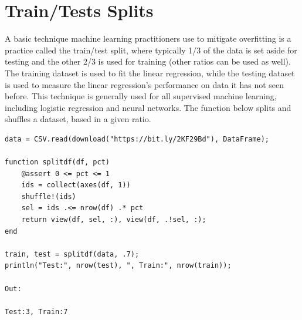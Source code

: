 \documentclass[a4paper, 11pt]{article}
\begin{document}
\section{Train/Tests Splits}

A basic technique machine learning practitioners use to mitigate overfitting is a practice called the train/test split, where typically 1/3 of the data is set aside for testing and the other 2/3 is used for training (other ratios can be used as well). The training dataset is used to fit the linear regression, while the testing dataset is used to measure the linear regression's performance on data it has not seen before. This technique is generally used for all supervised machine learning, including logistic regression and neural networks. The function below splits and shuffles a dataset, based in a given ratio.

\begin{lstlisting}[caption={Splitting a dataset in a given ratio}]
data = CSV.read(download("https://bit.ly/2KF29Bd"), DataFrame);

function splitdf(df, pct)
    @assert 0 <= pct <= 1
    ids = collect(axes(df, 1))
    shuffle!(ids)
    sel = ids .<= nrow(df) .* pct
    return view(df, sel, :), view(df, .!sel, :);
end

train, test = splitdf(data, .7);
println("Test:", nrow(test), ", Train:", nrow(train));

Out:

Test:3, Train:7
\end{lstlisting}
\end{document}
